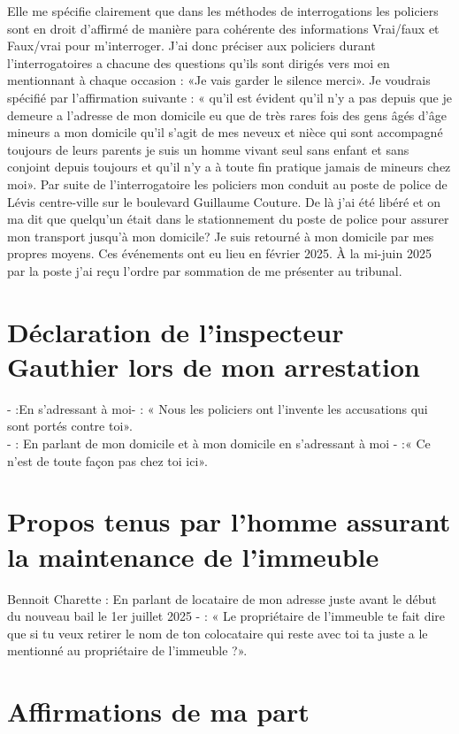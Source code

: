 \documentclass[12pt]{article}
\begin{document}
Elle me spécifie clairement que dans les méthodes de interrogations les policiers sont en droit d’affirmé de manière para cohérente des informations Vrai/faux et Faux/vrai pour m’interroger. J’ai donc préciser aux policiers durant l’interrogatoires a chacune des questions qu’ils sont dirigés vers moi en mentionnant à chaque occasion : «Je vais garder le silence merci». Je voudrais spécifié par l’affirmation suivante : « qu’il est évident qu’il n’y a pas depuis que je demeure a l’adresse de mon domicile eu que de très rares fois des gens âgés d’âge mineurs a mon domicile qu’il s’agit de mes neveux et nièce qui sont accompagné toujours de leurs parents je suis un homme vivant seul sans enfant et sans conjoint depuis toujours et qu’il n’y a à toute fin pratique jamais de mineurs chez moi». Par suite de l’interrogatoire les policiers mon conduit au poste de police de Lévis centre-ville sur le boulevard Guillaume Couture. De là j’ai été libéré et on ma dit que quelqu’un était dans le stationnement du poste de police pour assurer mon transport jusqu’à mon domicile? Je suis retourné à mon domicile par mes propres moyens. Ces événements ont eu lieu en février 2025. À la mi-juin 2025 par la poste j’ai reçu l’ordre par sommation de me présenter au tribunal.

\section*{Déclaration de l’inspecteur Gauthier lors de mon arrestation}

- :En s’adressant à moi- : « Nous les policiers ont l’invente les accusations qui sont portés contre toi».\\
- : En parlant de mon domicile et à mon domicile en s’adressant à moi - :« Ce n’est de toute façon pas chez toi ici».

\section*{Propos tenus par l’homme assurant la maintenance de l’immeuble}

Bennoit Charette : En parlant de locataire de mon adresse juste avant le début du nouveau bail le 1er juillet 2025 - : « Le propriétaire de l’immeuble te fait dire que si tu veux retirer le nom de ton colocataire qui reste avec toi ta juste a le mentionné au propriétaire de l’immeuble ?».

\section*{Affirmations de ma part}
\end{document}
